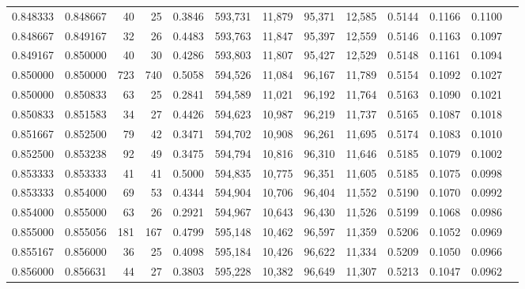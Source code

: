 \begin{tabular}{rrrrrrrrrrrrr}
0.848333 & 0.848667 &    40 &  25 &                                     0.3846 & 593,731 &  11,879 &  95,371 &  12,585 & 0.5144 & 0.1166 & 0.1100 \\
0.848667 & 0.849167 &    32 &  26 &                                     0.4483 & 593,763 &  11,847 &  95,397 &  12,559 & 0.5146 & 0.1163 & 0.1097 \\
0.849167 & 0.850000 &    40 &  30 &                                     0.4286 & 593,803 &  11,807 &  95,427 &  12,529 & 0.5148 & 0.1161 & 0.1094 \\
0.850000 & 0.850000 &   723 & 740 &                                     0.5058 & 594,526 &  11,084 &  96,167 &  11,789 & 0.5154 & 0.1092 & 0.1027 \\
0.850000 & 0.850833 &    63 &  25 &                                     0.2841 & 594,589 &  11,021 &  96,192 &  11,764 & 0.5163 & 0.1090 & 0.1021 \\
0.850833 & 0.851583 &    34 &  27 &                                     0.4426 & 594,623 &  10,987 &  96,219 &  11,737 & 0.5165 & 0.1087 & 0.1018 \\
0.851667 & 0.852500 &    79 &  42 &                                     0.3471 & 594,702 &  10,908 &  96,261 &  11,695 & 0.5174 & 0.1083 & 0.1010 \\
0.852500 & 0.853238 &    92 &  49 &                                     0.3475 & 594,794 &  10,816 &  96,310 &  11,646 & 0.5185 & 0.1079 & 0.1002 \\
0.853333 & 0.853333 &    41 &  41 &                                     0.5000 & 594,835 &  10,775 &  96,351 &  11,605 & 0.5185 & 0.1075 & 0.0998 \\
0.853333 & 0.854000 &    69 &  53 &                                     0.4344 & 594,904 &  10,706 &  96,404 &  11,552 & 0.5190 & 0.1070 & 0.0992 \\
0.854000 & 0.855000 &    63 &  26 &                                     0.2921 & 594,967 &  10,643 &  96,430 &  11,526 & 0.5199 & 0.1068 & 0.0986 \\
0.855000 & 0.855056 &   181 & 167 &                                     0.4799 & 595,148 &  10,462 &  96,597 &  11,359 & 0.5206 & 0.1052 & 0.0969 \\
0.855167 & 0.856000 &    36 &  25 &                                     0.4098 & 595,184 &  10,426 &  96,622 &  11,334 & 0.5209 & 0.1050 & 0.0966 \\
0.856000 & 0.856631 &    44 &  27 &                                     0.3803 & 595,228 &  10,382 &  96,649 &  11,307 & 0.5213 & 0.1047 & 0.0962 \\

\end{tabular}
